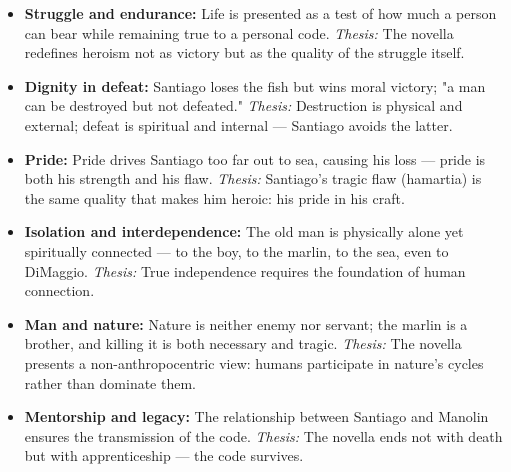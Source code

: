 \documentclass[11pt]{article}
\newcounter{popsec}
\newcounter{popsub}
\newcommand{\courssub}[1]{%
  \stepcounter{popsub}%
  \par\vspace{9pt}\noindent{\popxbold\fontsize{11.5}{13}\selectfont\color{popink}{\color{poporange}\thepopsec.\thepopsub}\hspace{6pt}#1}\par\nopagebreak\vspace{4pt}
}
\begin{document}
\courssub{Themes of the Novella}

\begin{aretenir}
\begin{itemize}
\item \textbf{Struggle and endurance:} Life is presented as a test of how much a person can bear while remaining true to a personal code. \emph{Thesis:} The novella redefines heroism not as victory but as the quality of the struggle itself.
\item \textbf{Dignity in defeat:} Santiago loses the fish but wins moral victory; "a man can be destroyed but not defeated." \emph{Thesis:} Destruction is physical and external; defeat is spiritual and internal — Santiago avoids the latter.
\item \textbf{Pride:} Pride drives Santiago too far out to sea, causing his loss — pride is both his strength and his flaw. \emph{Thesis:} Santiago's tragic flaw (hamartia) is the same quality that makes him heroic: his pride in his craft.
\item \textbf{Isolation and interdependence:} The old man is physically alone yet spiritually connected — to the boy, to the marlin, to the sea, even to DiMaggio. \emph{Thesis:} True independence requires the foundation of human connection.
\item \textbf{Man and nature:} Nature is neither enemy nor servant; the marlin is a brother, and killing it is both necessary and tragic. \emph{Thesis:} The novella presents a non-anthropocentric view: humans participate in nature's cycles rather than dominate them.
\item \textbf{Mentorship and legacy:} The relationship between Santiago and Manolin ensures the transmission of the code. \emph{Thesis:} The novella ends not with death but with apprenticeship — the code survives.
\end{itemize}
\end{aretenir}
\end{document}

